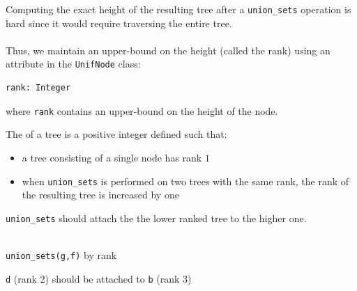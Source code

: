 \documentclass[mathserif, handout]{beamer}
\begin{document}
\begin{frame}[fragile]
Computing the exact height of the resulting tree after a \texttt{union\_sets} operation is hard since it would require traversing the entire tree.
\\~\\
Thus, we maintain an upper-bound on the height (called the rank) using an attribute in the \texttt{UnifNode} class:
\begin{lstlisting}[style=mypython]
rank: Integer
\end{lstlisting}
where \texttt{rank} contains an upper-bound on the height of the node.
\end{frame}

\begin{frame}
\begin{thmbox}
The  of a tree is a positive integer defined such that:
\begin{itemize}
\item a tree consisting of a single node has rank $1$
\item when \texttt{union\_sets} is performed on two trees with the same rank, the rank of the resulting tree is increased by one
\end{itemize}
\end{thmbox}
\end{frame}

\begin{frame}
\texttt{union\_sets} should attach the the lower ranked tree to the higher one.
\begin{center}
 \\
\footnotesize\color{gray} \texttt{union\_sets(g,f)} by rank
\end{center}
\begin{figure}
\centering
{}
\end{figure}
\begin{center}
    \footnotesize\color{gray} \texttt{d} (rank 2) should be attached to \texttt{b} (rank 3)
\end{center}
\end{frame}
\end{document}
